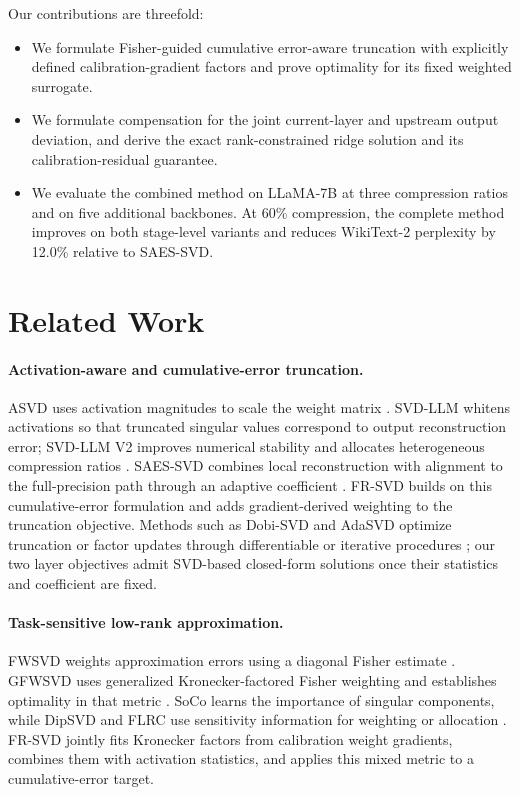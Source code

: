 \documentclass[11pt]{article}
\begin{document}
Our contributions are threefold:
\begin{itemize}
\item We formulate Fisher-guided cumulative error-aware truncation with explicitly defined calibration-gradient factors and prove optimality for its fixed weighted surrogate.
\item We formulate compensation for the joint current-layer and upstream output deviation, and derive the exact rank-constrained ridge solution and its calibration-residual guarantee.
\item We evaluate the combined method on LLaMA-7B at three compression ratios and on five additional backbones. At 60\% compression, the complete method improves on both stage-level variants and reduces WikiText-2 perplexity by 12.0\% relative to SAES-SVD.
\end{itemize}

\section{Related Work}\label{sec:related-work}

\paragraph{Activation-aware and cumulative-error truncation.}
ASVD uses activation magnitudes to scale the weight matrix \citep{yuan2023asvd}. SVD-LLM whitens activations so that truncated singular values correspond to output reconstruction error; SVD-LLM V2 improves numerical stability and allocates heterogeneous compression ratios \citep{wang2025svdllm,wang2025svdllmv2}. SAES-SVD combines local reconstruction with alignment to the full-precision path through an adaptive coefficient \citep{hu2026saessvd}. FR-SVD builds on this cumulative-error formulation and adds gradient-derived weighting to the truncation objective. Methods such as Dobi-SVD and AdaSVD optimize truncation or factor updates through differentiable or iterative procedures \citep{wang2025dobisvd,li2025adasvd}; our two layer objectives admit SVD-based closed-form solutions once their statistics and coefficient are fixed.

\paragraph{Task-sensitive low-rank approximation.}
FWSVD weights approximation errors using a diagonal Fisher estimate \citep{hsu2022fwsvd}. GFWSVD uses generalized Kronecker-factored Fisher weighting and establishes optimality in that metric \citep{chekalina2025gfwsvd}. SoCo learns the importance of singular components, while DipSVD and FLRC use sensitivity information for weighting or allocation \citep{li2025soco,ding2025dipsvd,lu2025flrc}. FR-SVD jointly fits Kronecker factors from calibration weight gradients, combines them with activation statistics, and applies this mixed metric to a cumulative-error target.
\end{document}
